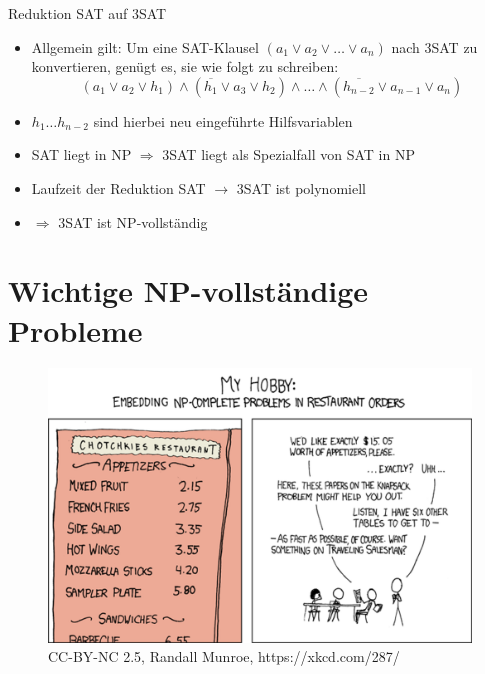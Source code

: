 \documentclass[ignorenonframetext,]{beamer}
\begin{document}
\begin{frame}{Reduktion SAT auf 3SAT}

\begin{itemize}
\itemsep1pt\parskip0pt
\item
  Allgemein gilt: Um eine SAT-Klausel
  $(a_1 \vee a_2 \vee \dots \vee a_n)$ nach 3SAT zu konvertieren, genügt
  es, sie wie folgt zu schreiben:
  \[ (a_1 \vee a_2 \vee h_1) \wedge (\overline{h_1} \vee a_3 \vee h_2) \wedge \dots \wedge (\overline{h_{n-2}} \vee a_{n-1} \vee a_n) \]
\item
  $h_1 \dots h_{n-2}$ sind hierbei neu eingeführte Hilfsvariablen
\item
  SAT liegt in NP $\Rightarrow$ 3SAT liegt als Spezialfall von SAT in NP
\item
  Laufzeit der Reduktion SAT $\rightarrow$ 3SAT ist polynomiell 
\item
  $\Rightarrow$ 3SAT ist NP-vollständig
\end{itemize}

\end{frame}

\section{Wichtige NP-vollständige
Probleme}\label{wichtige-np-vollstuxe4ndige-probleme}

\begin{frame}

\begin{figure}[htbp]
\centering
\includegraphics{img/xkcd_np_complete_big.png}
\caption{CC-BY-NC 2.5, Randall Munroe, https://xkcd.com/287/}
\end{figure}

\end{frame}
\end{document}
